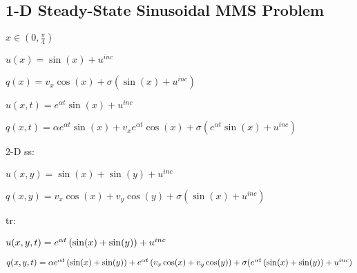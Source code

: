 \subsection{1-D Steady-State Sinusoidal MMS Problem}\label{sec:mms_sin_ss}
$x\in(0,\frac{\pi}{4})$

$u(x) = \sin(x) + u^{inc}$

$q(x) = v_x\cos(x) + \sigma(\sin(x) + u^{inc})$

$u(x,t) = e^{\alpha t}\sin(x) + u^{inc}$

$q(x,t) = \alpha e^{\alpha t}\sin(x) + v_x e^{\alpha t}\cos(x)
   + \sigma(e^{\alpha t}\sin(x) + u^{inc})$

2-D ss:

$u(x,y) = \sin(x) + \sin(y) + u^{inc}$

$q(x,y) = v_x\cos(x) + v_y\cos(y) + \sigma(\sin(x) + u^{inc})$

tr:

$u(x,y,t) = e^{\alpha t}\left(\sin(x) + \sin(y)\right) + u^{inc}$

$q(x,y,t) = \alpha e^{\alpha t}\left(\sin(x) + \sin(y)\right)
   + e^{\alpha t}\left(v_x \cos(x) + v_y \cos(y)\right)
   + \sigma(e^{\alpha t}\left(\sin(x) + \sin(y)\right) + u^{inc})$

